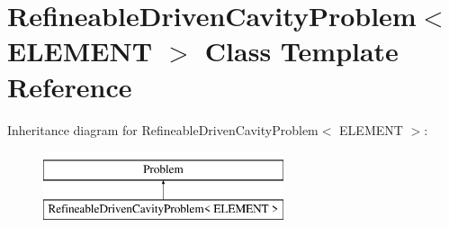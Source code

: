 \hypertarget{classRefineableDrivenCavityProblem}{}\section{Refineable\+Driven\+Cavity\+Problem$<$ E\+L\+E\+M\+E\+NT $>$ Class Template Reference}
\label{classRefineableDrivenCavityProblem}
Inheritance diagram for Refineable\+Driven\+Cavity\+Problem$<$ E\+L\+E\+M\+E\+NT $>$\+:\begin{figure}[H]
\begin{center}
\leavevmode
\includegraphics[height=2.000000cm]{classRefineableDrivenCavityProblem}
\end{center}
\end{figure}
